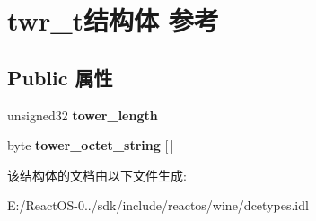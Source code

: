 \hypertarget{structtwr__t}{}\section{twr\+\_\+t结构体 参考}
\label{structtwr__t}
\subsection*{Public 属性}
\begin{DoxyCompactItemize}
\item 
\mbox{\label{structtwr__t_ae8506975d5da5da236b1079370ed00f9}} 
unsigned32 {\bfseries tower\+\_\+length}
\item 
\mbox{\label{structtwr__t_a03eaa4d0de14b1d27b08018f38e4585f}} 
byte {\bfseries tower\+\_\+octet\+\_\+string} \mbox{[}$\,$\mbox{]}
\end{DoxyCompactItemize}


该结构体的文档由以下文件生成\+:\begin{DoxyCompactItemize}
\item 
E\+:/\+React\+O\+S-\/0../sdk/include/reactos/wine/dcetypes.\+idl\end{DoxyCompactItemize}
